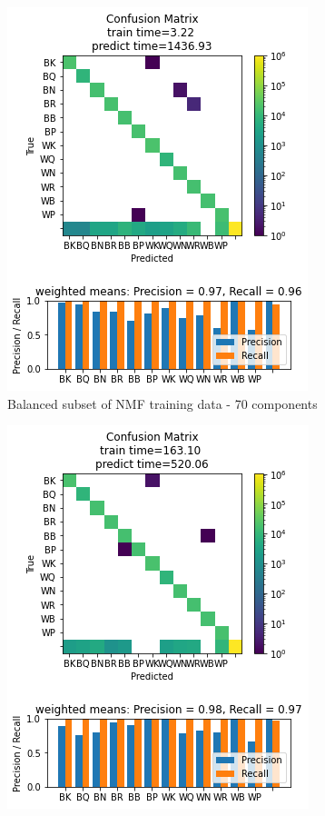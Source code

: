 \documentclass{article}
\newcommand{\NMFBL}{Balanced subset of NMF training data - 70 components}
\begin{document}
\begin{figure}[h]
\begin{subfigure}{0.33\textwidth}
\includegraphics[width=0.9\linewidth]{QDA_B_NMF70c_160x160_evaluation.png} 
\caption{\NMFBL}
\label{fig:subim1}
\end{subfigure}
\begin{subfigure}{0.33\textwidth}
\includegraphics[width=0.9\linewidth]{QDA_PCA50c_160x160_evaluation.png}

\end{subfigure}
\end{figure}
\end{document}
